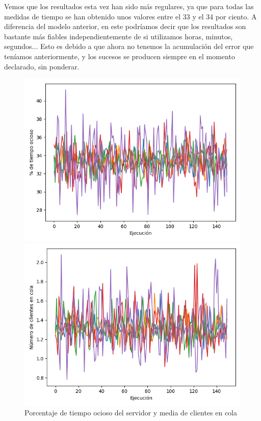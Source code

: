\documentclass[11pt,a4paper]{report}
\begin{document}
Vemos que los resultados esta vez han sido más regulares, ya que para todas las medidas de tiempo se han obtenido unos valores entre el 33 y el 34 por ciento. A
diferencia del modelo anterior, en este podríamos decir que los resultados son bastante más fiables independientemente de si utilizamos horas, minutos, segundos...
Esto es debido a que ahora no tenemos la acumulación del error que teníamos anteriormente, y los sucesos se producen siempre en el momento declarado, sin ponderar.
\begin{figure}[H]
\centering
\begin{minipage}{0.5\textwidth}
  \centering
  \includegraphics[scale=0.4]{img/incremento-variable-ocioso.png}
\end{minipage}%
\begin{minipage}{0.5\textwidth}
  \centering
  \includegraphics[scale=0.4]{img/incremento-variable-cola.png}
\end{minipage}
\caption{Porcentaje de tiempo ocioso del servidor y media de clientes en cola}
\end{figure}
\end{document}
